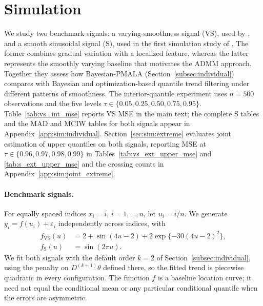 \section{Simulation}
\label{sec:simulations}

We study two benchmark signals: a varying-smoothness signal (VS), used by \citet{onizuka2024fast}, and a smooth sinusoidal signal (S), used in the first simulation study of \citet{brantley2020baseline}. The former combines gradual variation with a localized feature, whereas the latter represents the smoothly varying baseline that motivates the ADMM approach. Together they assess how Bayesian-PMALA (Section~\ref{subsec:individual}) compares with Bayesian and optimization-based quantile trend filtering under different patterns of smoothness. The interior-quantile experiment uses $n=500$ observations and the five levels $\tau\in\{0.05,0.25,0.50,0.75,0.95\}$. Table~\ref{tab:vs_int_mse} reports VS MSE in the main text; the complete S tables and the MAD and MCIW tables for both signals appear in Appendix~\ref{app:sim:individual}. Section~\ref{sec:sim:extreme} evaluates joint estimation of upper quantiles on both signals, reporting MSE at $\tau\in\{0.96,0.97,0.98,0.99\}$ in Tables~\ref{tab:vs_ext_upper_mse} and \ref{tab:s_ext_upper_mse} and the crossing counts in Appendix~\ref{app:sim:joint_extreme}.

\paragraph{Benchmark signals.} For equally spaced indices $x_i=i$, $i=1,\ldots,n$, let $u_i=i/n$. We generate $y_i=f(u_i)+\varepsilon_i$ independently across indices, with
\begin{align}
 f_{\mathrm{VS}}(u)&=2+\sin(4u-2)+2\exp\{-30(4u-2)^2\},
 \label{eq:sim_vs}\\
 f_{\mathrm{S}}(u)&=\sin(2\pi u).
 \label{eq:sim_s}
\end{align}
We fit both signals with the default order $k=2$ of Section~\ref{subsec:individual}, using the penalty on $D^{(k+1)}\theta$ defined there, so the fitted trend is piecewise quadratic in every configuration. The function $f$ is a baseline location curve; it need not equal the conditional mean or any particular conditional quantile when the errors are asymmetric.

